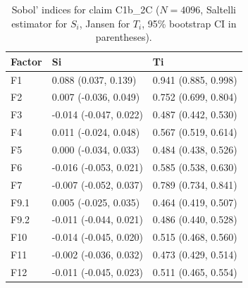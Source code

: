 \begin{table}[ht]
\centering
\caption{Sobol' indices for claim C1b_2C ($N=4096$, Saltelli estimator for $S_i$, Jansen for $T_i$, 95\% bootstrap CI in parentheses).} 
\label{tab:sobol_C1b_2C}
\begin{tabular}{lll}
  \hline
Factor & Si & Ti \\ 
  \hline
F1 & 0.088 (0.037, 0.139) & 0.941 (0.885, 0.998) \\ 
  F2 & 0.007 (-0.036, 0.049) & 0.752 (0.699, 0.804) \\ 
  F3 & -0.014 (-0.047, 0.022) & 0.487 (0.442, 0.530) \\ 
  F4 & 0.011 (-0.024, 0.048) & 0.567 (0.519, 0.614) \\ 
  F5 & 0.000 (-0.034, 0.033) & 0.484 (0.438, 0.526) \\ 
  F6 & -0.016 (-0.053, 0.021) & 0.585 (0.538, 0.630) \\ 
  F7 & -0.007 (-0.052, 0.037) & 0.789 (0.734, 0.841) \\ 
  F9.1 & 0.005 (-0.025, 0.035) & 0.464 (0.419, 0.507) \\ 
  F9.2 & -0.011 (-0.044, 0.021) & 0.486 (0.440, 0.528) \\ 
  F10 & -0.014 (-0.045, 0.020) & 0.515 (0.468, 0.560) \\ 
  F11 & -0.002 (-0.036, 0.032) & 0.473 (0.429, 0.514) \\ 
  F12 & -0.011 (-0.045, 0.023) & 0.511 (0.465, 0.554) \\ 
   \hline
\end{tabular}
\end{table}

